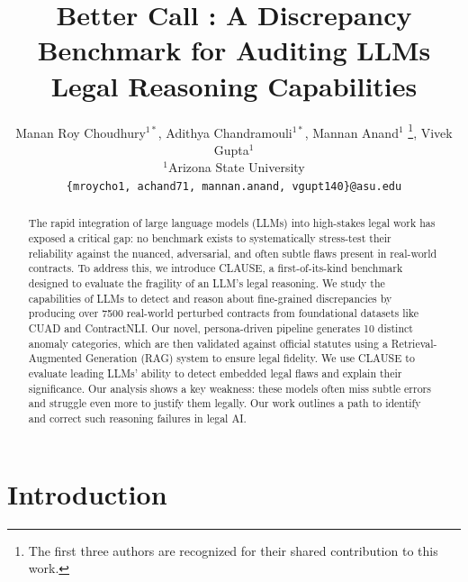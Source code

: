 \documentclass[11pt]{article}
\title{Better Call \datasetName: A Discrepancy Benchmark for Auditing LLMs Legal Reasoning Capabilities}
\author{
Manan Roy Choudhury$^{1*}$,
Adithya Chandramouli$^{1*}$,
Mannan Anand$^{1}$ \thanks{The first three authors are recognized for their shared contribution to this work.},
Vivek Gupta$^{1}$\\[4pt]
$^{1}$Arizona State University\\[2pt]
\texttt{\{mroycho1, achand71, mannan.anand, vgupt140\}@asu.edu}
}
\begin{document}
\maketitle
\begin{abstract}
The rapid integration of large language models (LLMs) into high-stakes legal work has exposed a critical gap: no benchmark exists to systematically stress-test their reliability against the nuanced, adversarial, and often subtle flaws present in real-world contracts. To address this, we introduce CLAUSE, a first-of-its-kind benchmark designed to evaluate the fragility of an LLM's legal reasoning. We study the capabilities of LLMs to detect and reason about fine-grained discrepancies by producing over 7500 real-world perturbed contracts from foundational datasets like CUAD and ContractNLI. Our novel, persona-driven pipeline generates 10 distinct anomaly categories, which are then validated against official statutes using a Retrieval-Augmented Generation (RAG) system to ensure legal fidelity. We use CLAUSE to evaluate leading LLMs’ ability to detect embedded legal flaws and explain their significance. Our analysis shows a key weakness: these models often miss subtle errors and struggle even more to justify them legally. Our work outlines a path to identify and correct such reasoning failures in legal AI.

\end{abstract}

\section{Introduction}
\end{document}

